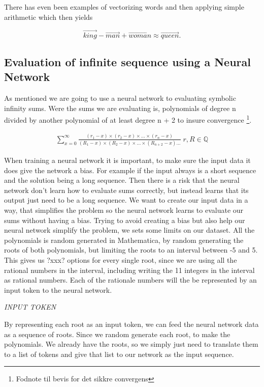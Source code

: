 There has even been examples of vectorizing words and then applying simple arithmetic which then yields

\begin{equation}
    \Vec{king} - \Vec{man} + \vec{woman} \approx \vec{queen}.
\end{equation}

\subsection{Evaluation of infinite sequence using a Neural Network}
As mentioned we are going to use a neural network to evaluating symbolic infinity sums. Were the sums we are evaluating is, polynomials of degree n divided by another polynomial of at least degree n + 2 to insure convergence \footnote{Fodnote til bevis for det sikkre convergens}. 

\begin{gather*}
    \sum_{x = 0}^{\infty} 
    \frac
    {(r_{1} - x)\times(r_{2} - x) \times ... \times(r_{n} - x)}
    {(R_{1} - x)\times(R_{2} - x) \times ... \times(R_{n+2} - x)...}
    \; r, R \in \mathbb{Q}
\end{gather*}


When training a neural network it is important, to make sure the input data it does give the network a bias. For example if the input always is a short sequence and the solution being a long sequence. Then there is a risk that the neural network don't learn how to evaluate sums correctly, but instead learns that its output just need to be a long sequence. 
We want to create our input data in a way, that simplifies the problem so the neural network learns to evaluate our sums without having a bias. Trying to avoid creating a bias but also help our neural network simplify the problem, we sets some limits on our dataset. All the polynomials is random generated in Mathematica, by random generating the roots of both polynomials, but limiting the roots to an interval between -5 and 5. This gives us ?xxx? options for every single root, since we are using all the rational numbers in the interval, including writing the 11 integers in the interval as rational numbers. Each of the rationale numbers will the be represented by an input token to the neural network. 


\emph{INPUT TOKEN}

By representing each root as an input token, we can feed the neural network data as a sequence of roots. Since we random generate each root, to make the polynomials. We already have the roots, so we simply just need to translate them to a list of tokens and give that list to our network as the input sequence. 

